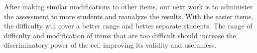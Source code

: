 After making similar modifications to other items, our next work is to administer the assessment to more students and reanalyze the results. With the easier items, the difficulty will cover a better range and better separate students. The range of difficulty and modification of items that are too difficult should increase the discriminatory power of the \gls{cci}, improving its validity and usefulness. %